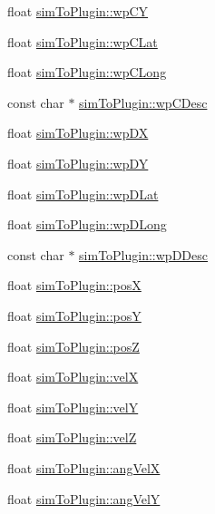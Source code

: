 \begin{DoxyCompactItemize}
\item 
float \hyperlink{group___aero_sim_r_c_ga3dd39df83926569f9d180ced28377a4f}{sim\-To\-Plugin\-::wp\-C\-Y}
\item 
float \hyperlink{group___aero_sim_r_c_ga478358c452d4087d066f487fab4f0fe4}{sim\-To\-Plugin\-::wp\-C\-Lat}
\item 
float \hyperlink{group___aero_sim_r_c_gafe8c244799a4b6767955285ea1ab4ed9}{sim\-To\-Plugin\-::wp\-C\-Long}
\item 
const char $\ast$ \hyperlink{group___aero_sim_r_c_gaac6ce2f906c7743fd06d88ed1e63f8d1}{sim\-To\-Plugin\-::wp\-C\-Desc}
\item 
float \hyperlink{group___aero_sim_r_c_ga152da5c47fb8ddaa28e0e18015292750}{sim\-To\-Plugin\-::wp\-D\-X}
\item 
float \hyperlink{group___aero_sim_r_c_ga04968f40e2545a32b4e052fe9e632504}{sim\-To\-Plugin\-::wp\-D\-Y}
\item 
float \hyperlink{group___aero_sim_r_c_ga39ee4024f6f29cf4c19531ccf9f8122a}{sim\-To\-Plugin\-::wp\-D\-Lat}
\item 
float \hyperlink{group___aero_sim_r_c_gad90f5c9d9b7ad07bee47b18838d0ddd8}{sim\-To\-Plugin\-::wp\-D\-Long}
\item 
const char $\ast$ \hyperlink{group___aero_sim_r_c_ga65acd288880e17514c40557035b74fe3}{sim\-To\-Plugin\-::wp\-D\-Desc}
\item 
float \hyperlink{group___aero_sim_r_c_gadc6f34115ac3890af669c35382d62882}{sim\-To\-Plugin\-::pos\-X}
\item 
float \hyperlink{group___aero_sim_r_c_ga55c533e8057bdcc0bb7e95440eb82ff5}{sim\-To\-Plugin\-::pos\-Y}
\item 
float \hyperlink{group___aero_sim_r_c_gab66796c7082a7d42685f8c8c3b282c43}{sim\-To\-Plugin\-::pos\-Z}
\item 
float \hyperlink{group___aero_sim_r_c_gad7b2d0364e0e774256fc64c187a8c336}{sim\-To\-Plugin\-::vel\-X}
\item 
float \hyperlink{group___aero_sim_r_c_gae4f260f3786184d15cd8f674860f8866}{sim\-To\-Plugin\-::vel\-Y}
\item 
float \hyperlink{group___aero_sim_r_c_ga2703ca3343da97af3ee57b5e6f36cbb9}{sim\-To\-Plugin\-::vel\-Z}
\item 
float \hyperlink{group___aero_sim_r_c_ga3332a8f491a5197d28d85241d32d6f81}{sim\-To\-Plugin\-::ang\-Vel\-X}
\item 
float \hyperlink{group___aero_sim_r_c_ga6e7df4d87006342b893db0452de1d4db}{sim\-To\-Plugin\-::ang\-Vel\-Y}
\item 

\end{DoxyCompactItemize}
